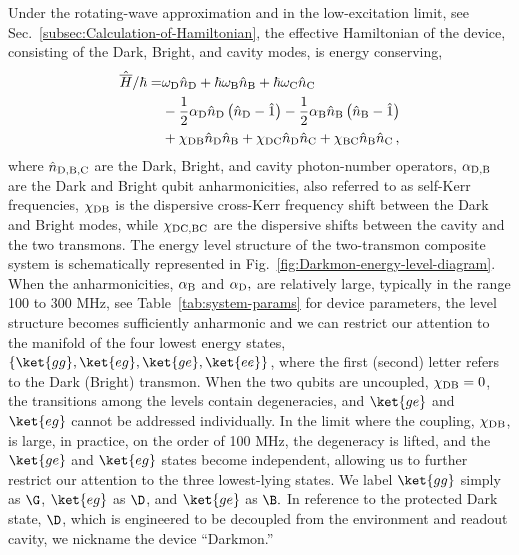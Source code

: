 Under the rotating-wave approximation and in the low-excitation limit,
see Sec.~\ref{subsec:Calculation-of-Hamiltonian}, the effective
Hamiltonian of the device, consisting of the Dark, Bright, and cavity
modes, is energy conserving, 
\begin{align}
\hat{\overline{H}}/\hbar= & \omega_{{\rm D}}\hat{n}_{\emph{{\rm D}}}+\hbar\omega_{{\rm B}}\hat{n}_{{\rm B}}+\hbar\omega_{{\rm C}}\hat{n}_{{\rm C}}\nonumber \\
 & -\frac{1}{2}\alpha_{{\rm D}}\hat{n}_{\emph{{\rm D}}}\left(\hat{n}_{\emph{{\rm D}}}-\hat{1}\right)-\frac{1}{2}\alpha_{{\rm B}}\hat{n}_{{\rm B}}\left(\hat{n}_{{\rm B}}-\hat{1}\right)\nonumber \\
 & +\chi_{{\rm DB}}\hat{n}_{\emph{{\rm D}}}\hat{n}_{{\rm B}}+\chi_{{\rm DC}}\hat{n}_{\emph{{\rm D}}}\hat{n}_{{\rm C}}+\chi_{{\rm BC}}\hat{n}_{{\rm B}}\hat{n}_{{\rm C}}\,,\label{eq:HDarkmon}
\end{align}
where $\hat{n}_{{\rm D,B,C}}$ are the Dark, Bright, and cavity photon-number
operators, $\alpha_{{\rm D,B}}$ are the Dark and Bright qubit anharmonicities,
also referred to as self-Kerr frequencies, $\chi_{{\rm DB}}$ is the
dispersive cross-Kerr frequency shift between the Dark and Bright
modes, while $\chi_{{\rm DC,BC}}$ are the dispersive shifts between
the cavity and the two transmons. The energy level structure of the
two-transmon composite system is schematically represented in Fig.~\ref{fig:Darkmon-energy-level-diagram}.
When the anharmonicities, $\alpha_{{\rm B}}$ and $\alpha_{{\rm D}},$
are relatively large, typically in the range 100 to 300 MHz, see Table~\ref{tab:system-params}
for device parameters, the level structure becomes sufficiently anharmonic
and we can restrict our attention to the manifold of the four lowest
energy states, $\left\{ \ket{gg},\ket{eg},\ket{ge},\ket{ee}\right\} $,
where the first (second) letter refers to the Dark (Bright) transmon.
When the two qubits are uncoupled, $\chi_{{\rm DB}}=0$, the transitions
among the levels contain degeneracies, and $\ket{ge}$ and $\ket{eg}$
cannot be addressed individually. In the limit where the coupling,
$\chi_{{\rm DB}}$, is large, in practice, on the order of 100 MHz,
the degeneracy is lifted, and the $\ket{ge}$ and $\ket{eg}$ states
become independent, allowing us to further restrict our attention
to the three lowest-lying states. We label $\ket{gg}$ simply as $\G$,
$\ket{eg}$ as $\D$, and $\ket{ge}$ as $\B.$ In reference to the
protected Dark state, $\D$, which is engineered to be decoupled from
the environment and readout cavity, we  nickname the device ``Darkmon.''

